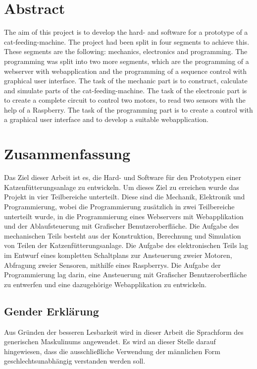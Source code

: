 \clearpage

\newpage
\thispagestyle{empty}
\mbox{}

\clearpage

\section*{Abstract}
\label{sec:abstract}
The aim of this project is to develop the hard- and software for a prototype of a cat-feeding-machine. The project had been split in four segments to achieve this. These segments are the following: mechanics, electronics and programming. The programming was split into two more segments, which are the programming of a webserver with webapplication and the programming of a sequence control with graphical user interface. The task of the mechanic part is to construct, calculate and simulate parts of the cat-feeding-machine. The task of the electronic part is to create a complete circuit to control two motors, to read two sensors with the help of a Raspberry. The task of the programming part is to create a control with a graphical user interface and to develop a suitable webapplication.

\section*{Zusammenfassung}
Das Ziel dieser Arbeit ist es, die Hard- und Software für den Prototypen einer Katzenfütterungsanlage zu entwickeln.
Um dieses Ziel zu erreichen wurde das Projekt in vier Teilbereiche unterteilt. Diese sind die Mechanik, Elektronik
und Programmierung, wobei die Programmierung zusätzlich in zwei Teilbereiche unterteilt wurde, in die Programmierung eines Webservers mit Webapplikation und der Ablaufsteuerung mit Grafischer Benutzeroberfläche. Die Aufgabe des mechanischen Teils besteht aus der Konstruktion, Berechnung und Simulation von Teilen der Katzenfütterungsanlage. Die Aufgabe des elektronischen Teils lag im Entwurf eines kompletten Schaltplans zur Ansteuerung zweier Motoren, Abfragung zweier Sensoren, mithilfe eines Raspberrys. Die Aufgabe der Programmierung lag darin, eine Ansteuerung mit Grafischer Benutzeroberfläche zu entwerfen und eine dazugehörige Webapplikation zu entwickeln.

\clearpage

\newpage
\thispagestyle{empty}
\mbox{}

\clearpage

\subsection*{Gender Erklärung}
\label{sec:gender-erklaerung}
Aus Gründen der besseren Lesbarkeit wird in dieser Arbeit die Sprachform des generischen Maskulinums angewendet. Es wird an dieser Stelle darauf hingewiesen, dass die ausschließliche Verwendung der männlichen Form geschlechtsunabhängig verstanden werden soll.

